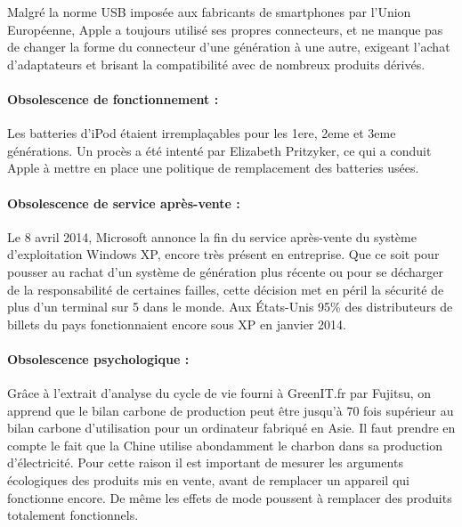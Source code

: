 Malgré la norme USB imposée aux fabricants de smartphones par l’Union Européenne, Apple a toujours utilisé ses propres connecteurs, et ne manque pas de changer la forme du connecteur d’une génération à une autre, exigeant l'achat d'adaptateurs et brisant la compatibilité avec de nombreux produits dérivés.

\paragraph*{Obsolescence de fonctionnement :}

Les batteries d’iPod étaient irremplaçables pour les 1ere, 2eme et 3eme générations. Un procès a été intenté par Elizabeth Pritzyker, ce qui a conduit Apple à mettre en place une politique de remplacement des batteries usées.

\paragraph*{Obsolescence de service après-vente :}

Le 8 avril 2014, Microsoft annonce la fin du service après-vente du système d’exploitation Windows XP, encore très présent en entreprise. Que ce soit pour pousser au rachat d’un système de génération plus récente ou pour se décharger de la responsabilité de certaines failles, cette décision met en péril la sécurité de plus d'un terminal sur 5 dans le monde. Aux États-Unis 95\% des distributeurs de billets du pays fonctionnaient encore sous XP en janvier 2014.


\paragraph*{Obsolescence psychologique :}

Grâce à l’extrait d’analyse du cycle de vie fourni à GreenIT.fr par Fujitsu, on apprend que le bilan carbone de production peut être jusqu’à 70 fois supérieur au bilan carbone d’utilisation pour un ordinateur fabriqué en Asie. Il faut prendre en compte le fait que la Chine utilise abondamment le charbon dans sa production d'électricité. Pour cette raison il est important de mesurer les arguments écologiques des produits mis en vente, avant de remplacer un appareil qui fonctionne encore. De même les effets de mode poussent à remplacer des produits totalement fonctionnels.

\newpage
